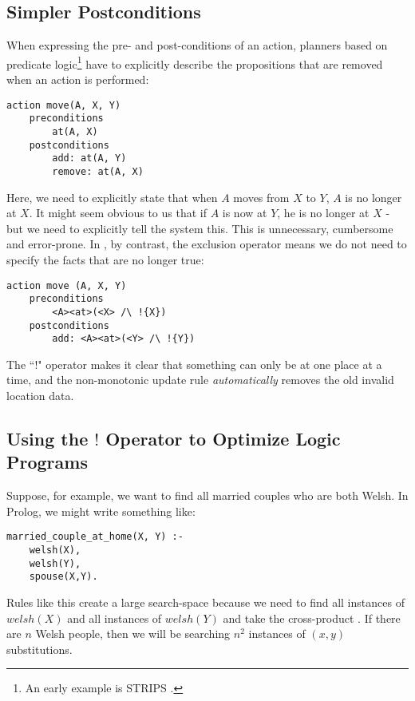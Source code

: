 \subsection{Simpler Postconditions}
When expressing the pre- and post-conditions of an action, planners based on predicate logic\footnote{An early example is STRIPS \cite{strips}.} have to explicitly describe the propositions that are removed when an action is performed:
\begin{verbatim}
action move(A, X, Y)
    preconditions
        at(A, X)
    postconditions
        add: at(A, Y) 
        remove: at(A, X)
\end{verbatim}
Here, we need to explicitly state that when $A$ moves from $X$ to $Y$, $A$ is no longer at $X$. It might seem obvious to us that if $A$ is now at $Y$, he is no longer at $X$ - but we need to explicitly tell the system this. This is unnecessary, cumbersome and error-prone. In \ELFULL{}, by contrast, the exclusion operator means we do not need to specify the facts that are no longer true:
\begin{verbatim}
action move (A, X, Y)
    preconditions
        <A><at>(<X> /\ !{X})
    postconditions
        add: <A><at>(<Y> /\ !{Y})
\end{verbatim}
The ``!" operator makes it clear that something can only be at one place at a time, and the non-monotonic update rule \emph{automatically} removes the old invalid location data.

\subsection{Using the $!$ Operator to Optimize Logic Programs}
Suppose, for example, we want to find all married couples who are both Welsh.
In Prolog, we might write something like:
\begin{verbatim}
married_couple_at_home(X, Y) :-
    welsh(X),
    welsh(Y),
    spouse(X,Y).
\end{verbatim}	
Rules like this create a large search-space because we need to find all instances of $welsh(X)$ and all instances of  $welsh(Y)$ and take the cross-product \cite{smith-and-genesereth}. If there are $n$ Welsh people, then we will be searching $n^2$ instances of $(x,y)$ substitutions.

